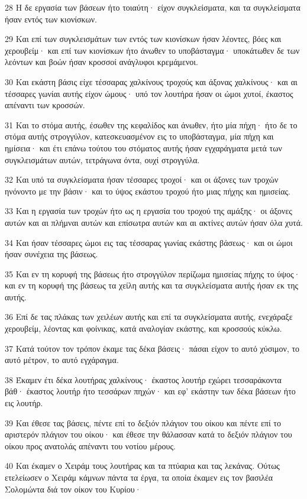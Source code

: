 \par 28 Η δε εργασία των βάσεων ήτο τοιαύτη· είχον συγκλείσματα, και τα συγκλείσματα ήσαν εντός των κιονίσκων.
\par 29 Και επί των συγκλεισμάτων των εντός των κιονίσκων ήσαν λέοντες, βόες και χερουβείμ· και επί των κιονίσκων ήτο άνωθεν το υποβάσταγμα· υποκάτωθεν δε των λεόντων και βοών ήσαν κροσσοί ανάγλυφοι κρεμάμενοι.
\par 30 Και εκάστη βάσις είχε τέσσαρας χαλκίνους τροχούς και άξονας χαλκίνους· και αι τέσσαρες γωνίαι αυτής είχον ώμους· υπό τον λουτήρα ήσαν οι ώμοι χυτοί, έκαστος απέναντι των κροσσών.
\par 31 Και το στόμα αυτής, έσωθεν της κεφαλίδος και άνωθεν, ήτο μία πήχη· ήτο δε το στόμα αυτής στρογγύλον, κατεσκευασμένον εις το υποβάσταγμα, μία πήχη και ημίσεια· και έτι επάνω τούτου του στόματος αυτής ήσαν εγχαράγματα μετά των συγκλεισμάτων αυτών, τετράγωνα όντα, ουχί στρογγύλα.
\par 32 Και υπό τα συγκλείσματα ήσαν τέσσαρες τροχοί· και οι άξονες των τροχών ηνόνοντο με την βάσιν· και το ύψος εκάστου τροχού ήτο μιας πήχης και ημισείας.
\par 33 Και η εργασία των τροχών ήτο ως η εργασία του τροχού της αμάξης· οι άξονες αυτών και αι πλήμναι αυτών και επίσωτρα αυτών και αι ακτίνες αυτών ήσαν όλα χυτά.
\par 34 Και ήσαν τέσσαρες ώμοι εις τας τέσσαρας γωνίας εκάστης βάσεως· και οι ώμοι ήσαν συνέχεια της βάσεως.
\par 35 Και εν τη κορυφή της βάσεως ήτο στρογγύλον περίζωμα ημισείας πήχης το ύψος· και εν τη κορυφή της βάσεως τα χείλη αυτής και τα συγκλείσματα αυτής ήσαν εκ της αυτής.
\par 36 Επί δε τας πλάκας των χειλέων αυτής και επί τα συγκλείσματα αυτής, ενεχάραξε χερουβείμ, λέοντας και φοίνικας, κατά αναλογίαν εκάστης, και κροσσούς κύκλω.
\par 37 Κατά τούτον τον τρόπον έκαμε τας δέκα βάσεις· πάσαι είχον το αυτό χύσιμον, το αυτό μέτρον, το αυτό εγχάραγμα.
\par 38 Έκαμεν έτι δέκα λουτήρας χαλκίνους· έκαστος λουτήρ εχώρει τεσσαράκοντα βάθ· έκαστος λουτήρ ήτο τεσσάρων πηχών· και εφ' εκάστην των δέκα βάσεων ήτο εις λουτήρ.
\par 39 Και έθεσε τας βάσεις, πέντε επί το δεξιόν πλάγιον του οίκου και πέντε επί το αριστερόν πλάγιον του οίκου· και έθεσε την θάλασσαν κατά το δεξιόν πλάγιον του οίκου προς ανατολάς απέναντι του νοτίου μέρους.
\par 40 Και έκαμεν ο Χειράμ τους λουτήρας και τα πτύαρια και τας λεκάνας. Ούτως ετελείωσεν ο Χειράμ κάμνων πάντα τα έργα, τα οποία έκαμεν εις τον βασιλέα Σολομώντα διά τον οίκον του Κυρίου·
